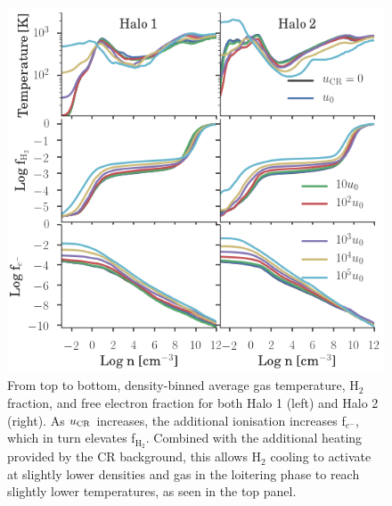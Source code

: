 \documentclass[usenatbib]{mn2e}
\newcommand{\htwo}{\mathrm{H}_2}
\newcommand{\ucr}{{u}_{\rm \small CR}}
\begin{document}
\begin{figure}
\begin{center}
\includegraphics[width=1\columnwidth]{figures/binned_T_efrac/binned_T_efrac}
\caption{\label{fig:efrac}
From top to bottom, density-binned average gas temperature, $\htwo$ fraction, and free electron fraction for both Halo 1 (left) and Halo 2  (right). 
As $\ucr$ increases, the additional ionisation increases f$_{e^-}$, which in turn elevates f$_{\htwo}$. 
Combined with the additional heating provided by the CR background, this allows $\htwo$ cooling to activate at slightly lower densities and gas in the loitering phase to reach slightly lower temperatures, as seen in the top panel.%
}
\end{center}
\end{figure}
\end{document}
